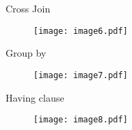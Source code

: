 \documentclass[a4paper,11pt,openright]{report}
\begin{document}
\vspace{20px}

{\footnotesize Cross Join}

\begin{figure}[ht!]
\texttt{[image: image6.pdf]}
\centering
\end{figure}

\pagebreak

\vspace{20px}

{\footnotesize Group by}

\begin{figure}[ht!]
\texttt{[image: image7.pdf]}
\centering
\end{figure}

\vspace{20px}

{\footnotesize Having clause}

\begin{figure}[ht!]
\texttt{[image: image8.pdf]}
\centering
\end{figure}
\end{document}
